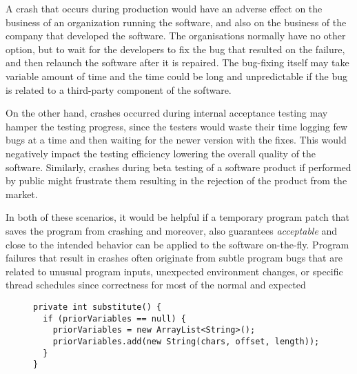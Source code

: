 A crash that occurs during production would
have an adverse effect on the business of an organization running the software, and also on the business
of the company that developed the software. The organisations normally have no other option, but to wait for the
developers to fix the bug that resulted on the failure, and then relaunch the software after it is repaired. The bug-fixing
itself may take variable amount of time and the time could be long and unpredictable if the bug is related to a third-party
component of the software.


On the other hand,
crashes occurred during internal acceptance testing may hamper the 
testing progress, since the testers would waste their time logging few bugs at a time and then waiting for the newer version with the fixes.
This would negatively impact the testing efficiency lowering the overall quality of the software.
Similarly, crashes during beta testing of a software product if performed by public might frustrate them 
resulting in the rejection of the product from the market.

In both of these scenarios, it would be helpful if a temporary program patch that saves the program from crashing
and moreover, also guarantees \textit{acceptable} and close to the intended behavior
can be applied to the software on-the-fly. Program failures that result in crashes often originate from subtle
program bugs that are related to unusual program inputs, unexpected environment changes, or specific
thread schedules since correctness for most of the normal and expected 




\lstset{language=Java , caption=Apache Log4j bug example.,
label=snippet:exampleRepairing1}
\begin{figure}[t]
\begin{lstlisting}
private int substitute() {
  if (priorVariables == null) {
    priorVariables = new ArrayList<String>();
    priorVariables.add(new String(chars, offset, length));
  }
}
\end{lstlisting}
\end{figure}

